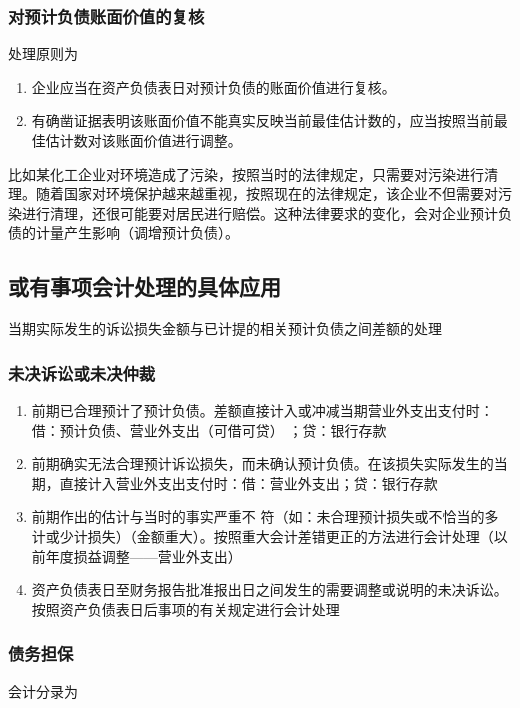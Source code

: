 \documentclass[UTF8,12pt]{ctexart}
\numberwithin{equation}{section} %
\numberwithin{figure}{section}
\numberwithin{table}{section}
\begin{document}
	
	\subsubsection{对预计负债账面价值的复核}
	处理原则为
	\begin{enumerate}
		\item 企业应当在资产负债表日对预计负债的账面价值进行复核。
		
		\item 有确凿证据表明该账面价值不能真实反映当前最佳估计数的，应当按照当前最佳估计数对该账面价值进行调整。
	\end{enumerate}
	
	比如某化工企业对环境造成了污染，按照当时的法律规定，只需要对污染进行清理。随着国家对环境保护越来越重视，按照现在的法律规定，该企业不但需要对污染进行清理，还很可能要对居民进行赔偿。这种法律要求的变化，会对企业预计负债的计量产生影响（调增预计负债）。
	
	\subsection{或有事项会计处理的具体应用}
	当期实际发生的诉讼损失金额与已计提的相关预计负债之间差额的处理
	
	\subsubsection{未决诉讼或未决仲裁}
	\begin{enumerate}
		\item 前期已合理预计了预计负债。差额直接计入或冲减当期营业外支出支付时：借：预计负债、营业外支出（可借可贷） ；贷：银行存款
		
		\item 前期确实无法合理预计诉讼损失，而未确认预计负债。在该损失实际发生的当期，直接计入营业外支出支付时：借：营业外支出；贷：银行存款
		
		
		\item 前期作出的估计与当时的事实严重不 符（如：未合理预计损失或不恰当的多计或少计损失）（金额重大）。按照重大会计差错更正的方法进行会计处理（以前年度损益调整——营业外支出）
		
		
		\item 资产负债表日至财务报告批准报出日之间发生的需要调整或说明的未决诉讼。按照资产负债表日后事项的有关规定进行会计处理
	\end{enumerate}


	\subsubsection{债务担保}
	会计分录为
	
\end{document}
